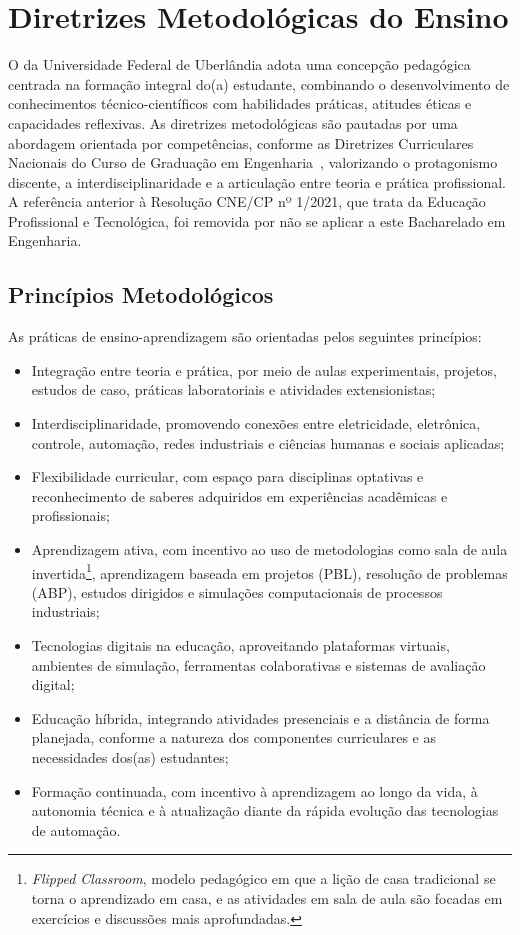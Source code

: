 \chapter{Diretrizes Metodológicas do Ensino}
\label{chp:diretrizes_pedagogicas}

O \ppccurso da Universidade Federal de Uberlândia adota uma concepção pedagógica centrada na formação integral do(a) estudante, combinando o desenvolvimento de conhecimentos técnico-científicos com habilidades práticas, atitudes éticas e capacidades reflexivas. As diretrizes metodológicas são pautadas por uma abordagem orientada por competências, conforme as Diretrizes Curriculares Nacionais do Curso de Graduação em Engenharia~\cite{cne_ces_2_2019,cne_ces_1_2021}, valorizando o protagonismo discente, a interdisciplinaridade e a articulação entre teoria e prática profissional. A referência anterior à Resolução CNE/CP nº 1/2021, que trata da Educação Profissional e Tecnológica, foi removida por não se aplicar a este Bacharelado em Engenharia.

\section{Princípios Metodológicos}

As práticas de ensino-aprendizagem são orientadas pelos seguintes princípios:

\begin{itemize}
    \item Integração entre teoria e prática, por meio de aulas experimentais, projetos, estudos de caso, práticas laboratoriais e atividades extensionistas;
    \item Interdisciplinaridade, promovendo conexões entre eletricidade, eletrônica, controle, automação, redes industriais e ciências humanas e sociais aplicadas;
    \item Flexibilidade curricular, com espaço para disciplinas optativas e reconhecimento de saberes adquiridos em experiências acadêmicas e profissionais;
    \item Aprendizagem ativa, com incentivo ao uso de metodologias como sala de aula invertida\footnote{\textit{Flipped Classroom}, modelo pedagógico em que a lição de casa tradicional se torna o aprendizado em casa, e as atividades em sala de aula são focadas em exercícios e discussões mais aprofundadas.}, aprendizagem baseada em projetos (PBL), resolução de problemas (ABP), estudos dirigidos e simulações computacionais de processos industriais;
    \item Tecnologias digitais na educação, aproveitando plataformas virtuais, ambientes de simulação, ferramentas colaborativas e sistemas de avaliação digital;
    \item Educação híbrida, integrando atividades presenciais e a distância de forma planejada, conforme a natureza dos componentes curriculares e as necessidades dos(as) estudantes;
    \item Formação continuada, com incentivo à aprendizagem ao longo da vida, à autonomia técnica e à atualização diante da rápida evolução das tecnologias de automação.
\end{itemize}

